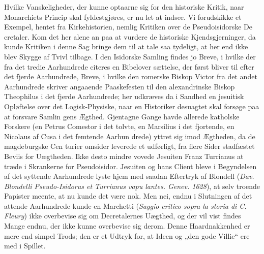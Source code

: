\documentclass[12pt]{book}
\newcommand{\opage}[1]{\marginnote{\footnotesize\textit{[#1]}}}
\begin{document}
Hvilke Vanskeligheder, der kunne optaarne sig for den
historiske Kritik, naar Monarchiets Princip skal fyldestgjøres,
er nu let at indsee. Vi forudskikke et Exempel, hentet fra
Kirkehistorien, nemlig Kritiken over de Pseudoisidorske De\-%
cretaler. Kom det her alene an paa at vurdere de historiske
Kjendsgjerninger, da kunde Kritiken i denne Sag bringe dem
\opage{43}\setcounter{footnote}{0}%
til at tale saa tydeligt, at her end ikke blev Skygge af
Tvivl tilbage. I den Isidorske Samling findes jo Breve, i
hvilke der fra det tredie Aarhundrede citeres en Bibelover\-%
sættelse, der først bliver til efter det fjerde Aarhundrede,
Breve, i hvilke den romerske Biskop Victor fra det andet
Aarhundrede skriver angaaende Paaskefesten til den alexandrinske
Biskop Theophilus i det fjerde Aarhundrede; her udkræves da i
Sandhed en jesuitisk Opløftelse over det Logisk-Physiske, naar
en Historiker desuagtet skal forsøge paa at forsvare Samlin\-%
gens Ægthed. Gjentagne Gange havde allerede katholske
Forskere (en Petrus Comestor i det tolvte, en Marsilius i
det fjortende, en Nicolaus af Cusa i det femtende Aarhun\-%
drede) yttret sig imod Ægtheden, da de magdeburgske Cen\-%
turier omsider leverede et udførligt, fra flere Sider stadfæstet
Beviis for Uægtheden. Ikke desto mindre vovede Jesuiten
Franz Turrianus at træde i Skrankerne for Pseudoisidor.
Jesuiten og hans Client bleve i Begyndelsen af det syttende
Aarhundrede lyste hjem med saadan
Eftertryk af Blondell
(\textit{Dav. Blondelli Pseudo-Isidorus et Turrianus vapu\-%
lantes. Genev. 1628}), at selv troende Papister meente, at
nu kunde det være nok. Men nei, endnu i Slutningen af det
attende Aarhundrede kunde en Marchetti (\textit{Saggio critico sopra
la storia di C. Fleury}) ikke overbevise sig om Decretalernes
Uægthed, og der vil vist findes Mange endnu, der ikke kunne
overbevise sig derom. Denne Haardnakkenhed er mere end simpel
Trods; den er et Udtryk for, at Ideen og „den gode Villie“
ere med i Spillet.
\end{document}
